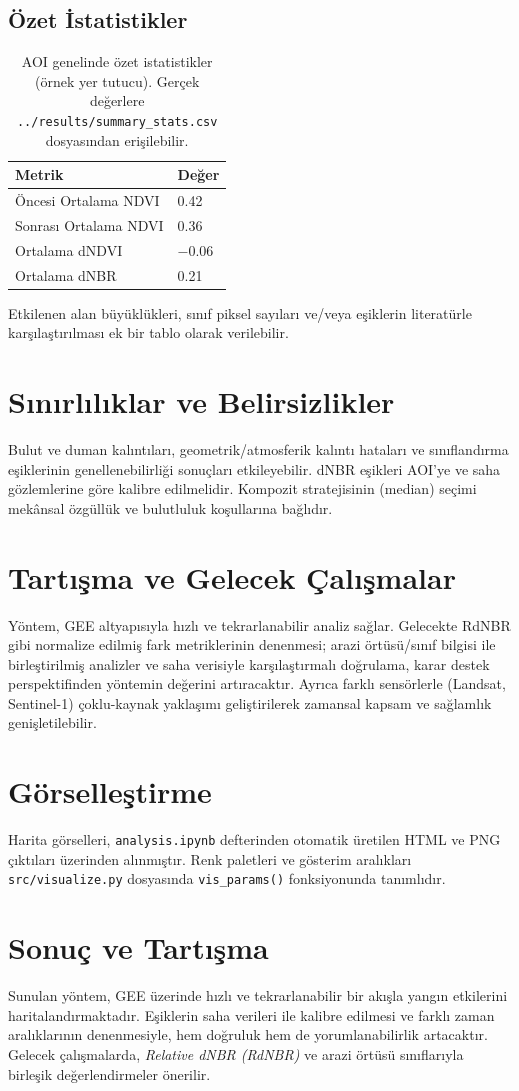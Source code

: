 \documentclass[11pt,a4paper]{article}
\begin{document}
\subsection*{Özet İstatistikler}
\begin{table}[h]
  \centering
  \begin{tabular}{@{}ll@{}}\toprule
  Metrik & Değer \\\midrule
  Öncesi Ortalama NDVI & 0.42 \\
  Sonrası Ortalama NDVI & 0.36 \\
  Ortalama dNDVI & $-0.06$ \\
  Ortalama dNBR & 0.21 \\\bottomrule
  \end{tabular}
  \caption{AOI genelinde özet istatistikler (örnek yer tutucu). Gerçek değerlere \texttt{../results/summary\_stats.csv} dosyasından erişilebilir.}
\end{table}

Etkilenen alan büyüklükleri, sınıf piksel sayıları ve/veya eşiklerin literatürle
karşılaştırılması ek bir tablo olarak verilebilir.

\section{Sınırlılıklar ve Belirsizlikler}
Bulut ve duman kalıntıları, geometrik/atmosferik kalıntı hataları ve sınıflandırma
eşiklerinin genellenebilirliği sonuçları etkileyebilir. dNBR eşikleri AOI'ye ve saha
gözlemlerine göre kalibre edilmelidir. Kompozit stratejisinin (median) seçimi mekânsal
özgüllük ve bulutluluk koşullarına bağlıdır.

\section{Tartışma ve Gelecek Çalışmalar}
Yöntem, GEE altyapısıyla hızlı ve tekrarlanabilir analiz sağlar. Gelecekte RdNBR gibi
normalize edilmiş fark metriklerinin denenmesi; arazi örtüsü/sınıf bilgisi ile
birleştirilmiş analizler ve saha verisiyle karşılaştırmalı doğrulama, karar destek
perspektifinden yöntemin değerini artıracaktır. Ayrıca farklı sensörlerle (Landsat,\,Sentinel-1)
çoklu-kaynak yaklaşımı geliştirilerek zamansal kapsam ve sağlamlık genişletilebilir.

\section{Görselleştirme}
Harita görselleri, \texttt{analysis.ipynb} defterinden otomatik üretilen HTML ve PNG
çıktıları üzerinden alınmıştır. Renk paletleri ve gösterim aralıkları \texttt{src/visualize.py}
dosyasında \texttt{vis\_params()} fonksiyonunda tanımlıdır.

\section{Sonuç ve Tartışma}
Sunulan yöntem, GEE üzerinde hızlı ve tekrarlanabilir bir akışla yangın etkilerini
haritalandırmaktadır. Eşiklerin saha verileri ile kalibre edilmesi ve farklı
zaman aralıklarının denenmesiyle, hem doğruluk hem de yorumlanabilirlik artacaktır.
Gelecek çalışmalarda, \emph{Relative dNBR (RdNBR)} ve arazi örtüsü sınıflarıyla
birleşik değerlendirmeler önerilir.
\end{document}
